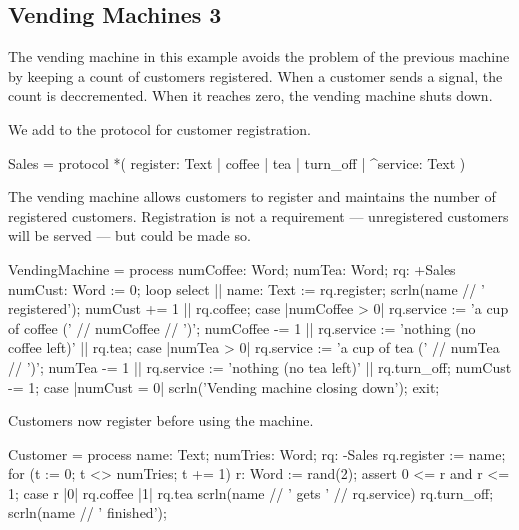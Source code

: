 \subsection{Vending Machines 3}\label{sec-vm-3}

The vending machine in this example avoids the problem of the previous machine by keeping a count of customers registered.  When a customer sends a  signal, the count is deccremented.  When it reaches zero, the vending machine shuts down.

We add  to the protocol for customer registration.
\begin{code}
Sales = protocol { *( register: Text | coffee | tea | turn_off | ^service: Text ) }    
\end{code}

The vending machine allows customers to register and maintains the number of registered customers.  Registration is not a requirement --- unregistered customers will be served --- but could be made so.
\begin{code}
VendingMachine = process numCoffee: Word; numTea: Word; rq: +Sales
{
    numCust: Word := 0;
    loop select
    {
        ||  name: Text := rq.register; 
            scrln(name // ' registered');
            numCust += 1
        ||  rq.coffee; 
            case
            {
                |numCoffee > 0| 
                    rq.service := 'a cup of coffee (' // numCoffee // ')';
                                numCoffee -= 1
                || rq.service := 'nothing (no coffee left)'
            }
        ||  rq.tea; 
            case
            {
                |numTea > 0| rq.service := 'a cup of tea (' // numTea // ')';
                                numTea -= 1
                || rq.service := 'nothing (no tea left)'
            }
        ||  rq.turn_off;
            numCust -= 1;
            case
            {
                |numCust = 0| 
                    scrln('Vending machine closing down');
                    exit;
            }
    }
}
\end{code}

Customers now register before using the machine.
\begin{code}
Customer = process name: Text; numTries: Word; rq: -Sales
{
    rq.register := name;
    for (t := 0; t <> numTries; t += 1)
    {
        r: Word := rand(2);
        assert 0 <= r and r <= 1;
        case r
        {
            |0| rq.coffee
            |1| rq.tea
        }
        scrln(name // ' gets ' // rq.service)
    }
    rq.turn_off;
    scrln(name // ' finished');
}
\end{code}

